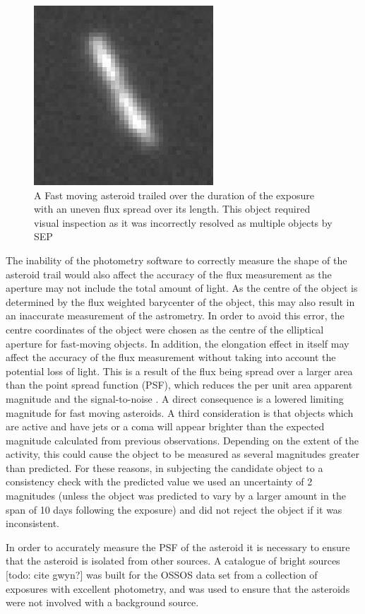 \documentclass[iop,apj]{emulateapj}
\begin{document}
\begin{figure}[!htb]
    \centering
    \includegraphics[width=0.4\linewidth]{images/flux_spread.png}
    \caption{A Fast moving asteroid trailed over the duration of the exposure with an uneven flux spread over its length. This object required visual inspection as  it was incorrectly resolved as multiple objects by SEP}\label{fig:6}
\end{figure}


The inability of the photometry software to correctly measure the shape of the asteroid trail would also affect the accuracy of the flux measurement as the aperture may not include the total amount of light. As the centre of the object is determined by the flux weighted barycenter of the object, this may also result in an inaccurate measurement of the astrometry. In order to avoid this error, the centre coordinates of the object were chosen as the centre of the elliptical aperture for fast-moving objects. 
In addition, the elongation effect in itself may affect the accuracy of the flux measurement without taking into account the potential loss of light. This is a result of the flux being spread over a larger area than the point spread function (PSF), which reduces the per unit area apparent magnitude and the signal-to-noise \citep{veres12}. A direct consequence is a lowered limiting magnitude for fast moving asteroids. 
A third consideration is that objects which are active and have jets or a coma will appear brighter than the expected magnitude calculated from previous observations. Depending on the extent of the activity, this could cause the object to be measured as several magnitudes greater than predicted. For these reasons, in subjecting the candidate object to a consistency check with the predicted value we used an uncertainty of 2 magnitudes (unless the object was predicted to vary by a larger amount in the span of 10 days following the exposure) and did not reject the object if it was inconsistent.

In order to accurately measure the PSF of the asteroid it is necessary to ensure that the asteroid is isolated from other sources. A catalogue of bright sources [todo: cite gwyn?] was built for the OSSOS data set from a collection of exposures with excellent photometry, and was used to ensure that the asteroids were not involved with a background source.
\end{document}
